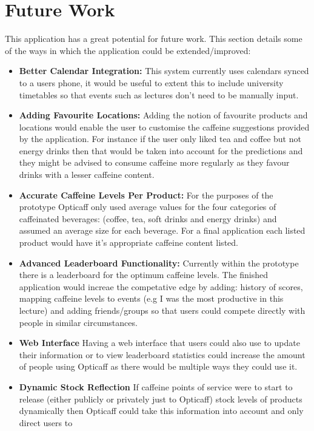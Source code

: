 \section{Future Work}

This application has a great potential for future work. This section details some of the ways in which the application could be extended/improved:

\begin{itemize}
	\item{\textbf{Better Calendar Integration:}
		This system currently uses calendars synced to a users phone, it would be useful to extent this to include  		    university timetables so that events such as lectures don't need to be manually input.
	}
	\item{\textbf{Adding Favourite Locations:}
		Adding the notion of favourite products and locations would enable the user to customise the caffeine 
		suggestions provided by the application. For instance if the user only liked tea and coffee but not energy
		drinks then that would be taken into account for the predictions and they might be advised to consume
		caffeine more regularly as they favour drinks with a lesser caffeine content. 
	}
	\item{\textbf{Accurate Caffeine Levels Per Product:}
		For the purposes of the prototype Opticaff only used average values for the four categories of caffeinated
		beverages: (coffee, tea, soft drinks and energy drinks) and assumed an average size for each beverage. For a
		final application each listed product would have it's appropriate caffeine content listed. 
	}
	\item{\textbf{Advanced Leaderboard Functionality:}
	Currently within the prototype there is a leaderboard for the optimum caffeine levels. The finished application
	would increae the competative edge by adding: history of scores, mapping caffeine levels to events (e.g I was the
	most productive in this lecture) and adding friends/groups so that users could compete directly with people in
	similar circumstances.
	}
	\item{\textbf{Web Interface}
	Having a web interface that users could also use to update their information or to view leaderboard statistics
	could increase the amount of people using Opticaff as there would be multiple ways they could use it. 
	}
	\item{\textbf{Dynamic Stock Reflection}
	If caffeine points of service were to start to release (either publicly or privately just to Opticaff) stock
	levels of products dynamically then Opticaff could take this information into account and only direct users to
}
\end{itemize}
